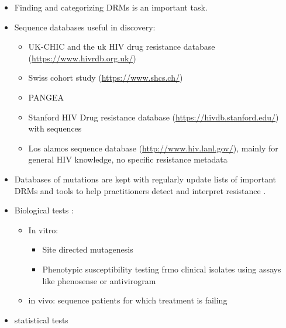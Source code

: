 \documentclass[
  11pt,
  twoside]{scrbook}
\providecommand{\tightlist}{%
  \setlength{\itemsep}{0pt}\setlength{\parskip}{0pt}}
\begin{document}
\begin{itemize}
\tightlist
\item
  Finding and categorizing DRMs is an important task.
\item
  Sequence databases useful in discovery:

  \begin{itemize}
  \item
    UK-CHIC \autocite{ukchicsteeringcommitteeCreationLargeUKbased2004} and the uk HIV drug resistance database (\url{https://www.hivrdb.org.uk/})
  \item
    Swiss cohort study (\url{https://www.shcs.ch/})
  \item
    PANGEA \autocite{abeler-dornerPANGEAHIVPhylogeneticsNetworks2019}
  \item
    Stanford HIV Drug resistance database (\url{https://hivdb.stanford.edu/}) with sequences \autocite{rheeHumanImmunodeficiencyVirus2003}
  \item
    Los alamos sequence database (\url{http://www.hiv.lanl.gov/}), mainly for general HIV knowledge, no specific resistance metadata \autocite{kuikenHIVSequenceDatabases2003}
  \end{itemize}
\item
  Databases of mutations are kept \autocite{shaferRationaleUsesPublic2006} with regularly update lists of important DRMs \autocite{wensing2019UpdateDrug2019,clarkMutationsRetroviralGenes2007} and tools to help practitioners detect and interpret resistance \autocite{liuWebResourcesHIV2006d}.
\item
  Biological tests \autocite{johnsonUpdateDrugResistance2016,wensing2019UpdateDrug2019}:

  \begin{itemize}
  \item
    In vitro:

    \begin{itemize}
    \item
      Site directed mutagenesis \autocite{larderMultipleMutationsHIV11989,devreeseResistanceHumanImmunodeficiency1992}
    \item
      Phenotypic susceptibility testing frmo clinical isolates \autocite{masquelierGenotypicPhenotypicResistance2001} using assays like phenosense \autocite{petropoulosNovelPhenotypicDrug2000} or antivirogram \autocite{hertogsRapidMethodSimultaneous1998}
    \end{itemize}
  \item
    in vivo: sequence patients for which treatment is failing \autocite{tambuyzerEffectMutationsPosition2011,katzensteinPhenotypicSusceptibilityVirological2003}
  \end{itemize}
\item
  statistical tests \autocite{johnsonUpdateDrugResistance2016,wensing2019UpdateDrug2019}


\end{itemize}
\end{document}
